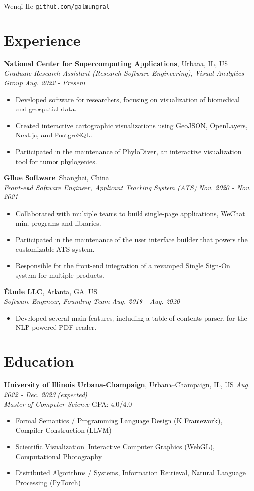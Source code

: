 \documentclass[11pt]{article}
\begin{document}
{\Huge Wenqi He} \quad \texttt{github.com/galmungral}

\section*{Experience}
\textbf{National Center for Supercomputing Applications}, Urbana, IL, US\\
\textit{Graduate Research Assistant (Research Software Engineering), Visual Analytics Group \hfill Aug. 2022 - Present}
\begin{itemize}
\item Developed software for researchers, focusing on visualization of biomedical and geospatial data.
\item Created interactive cartographic visualizations using GeoJSON, OpenLayers, Next.js, and PostgreSQL.
\item Participated in the maintenance of PhyloDiver, an interactive visualization tool for tumor phylogenies.
\end{itemize}
\vspace{0.5em}
\textbf{Gllue Software}, Shanghai, China\\
\textit{Front-end Software Engineer, Applicant Tracking System (ATS) \hfill Nov. 2020 - Nov. 2021}
\begin{itemize}
\item Collaborated with multiple teams to build single-page applications, WeChat mini-programs and libraries.
\item Participated in the maintenance of the user interface builder that powers the customizable ATS system.
\item Responsible for the front-end integration of a revamped Single Sign-On system for multiple products.
\end{itemize}
\vspace{0.5em}
\textbf{Étude LLC}, Atlanta, GA, US\\
\textit{Software Engineer, Founding Team \hfill Aug. 2019 - Aug. 2020}
\begin{itemize}
\item Developed several main features, including a table of contents parser, for the NLP-powered PDF reader.
\end{itemize}

\section*{Education}
\textbf{University of Illinois Urbana-Champaign}, Urbana–Champaign, IL, US \hfill \textit{Aug. 2022 - Dec. 2023 (expected)} \\
\textit{Master of Computer Science}  \hfill GPA: 4.0/4.0 
\begin{itemize}
\item Formal Semantics / Programming Language Design (K Framework), Compiler Construction (LLVM)
\item Scientific Visualization, Interactive Computer Graphics (WebGL), Computational Photography
\item Distributed Algorithms / Systems, Information Retrieval, Natural Language Processing (PyTorch)
\end{itemize}
\end{document}
